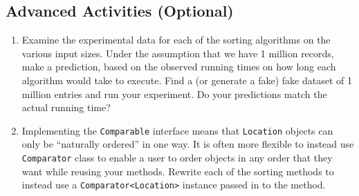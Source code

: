 \documentclass[12pt]{scrartcl}
\begin{document}
\subsection*{Advanced Activities (Optional)}

\begin{enumerate}
  \item Examine the experimental data for each of the sorting algorithms 
    on the various input sizes.  Under the assumption that we have 1 
    million records, make a prediction, based on the observed running 
    times on how long each algorithm would take to execute.  Find a (or 
    generate a fake) fake dataset of 1 million entries and run your 
    experiment.  Do your predictions match the actual running time?
  \item Implementing the \texttt{Comparable} interface means 
    that \texttt{Location} objects can only be ``naturally 
    ordered'' in one way.  It is often more flexible to instead use 
    \texttt{Comparator} class to enable a user to order objects 
    in any order that they want while reusing your methods.  Rewrite 
    each of the sorting methods to instead use a 
    \texttt{Comparator<Location>} instance passed in to the 
    method. 
\end{enumerate}
\end{document}
